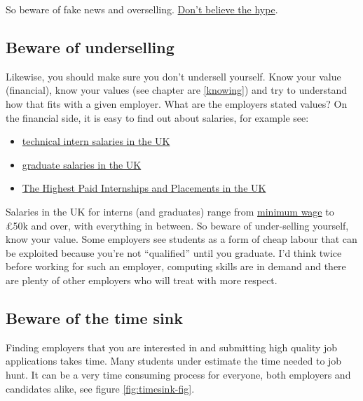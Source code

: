 \documentclass[
]{book}
\providecommand{\tightlist}{%
  \setlength{\itemsep}{0pt}\setlength{\parskip}{0pt}}
\begin{document}
So beware of fake news and overselling. \href{https://en.wikipedia.org/wiki/Don\%27t_Believe_the_Hype}{Don't believe the hype}. \citep{dontbelievethehype}

\hypertarget{undersell}{%
\subsection{Beware of underselling}\label{undersell}}

Likewise, you should make sure you don't undersell yourself. Know your value (financial), know your values (see chapter are \ref{knowing}) and try to understand how that fits with a given employer. What are the employers stated values? On the financial side, it is easy to find out about salaries, for example see:

\begin{itemize}
\tightlist
\item
  \href{https://github.com/IgWod/interns-salaries-uk-2018}{technical intern salaries in the UK} \citep{igwod}
\item
  \href{https://luminate.prospects.ac.uk/graduate-salaries-in-the-uk}{graduate salaries in the UK} \citep{michaelgrove}
\item
  \href{https://www.ratemyplacement.co.uk/blog/highest-paid-internships-placements-uk/}{The Highest Paid Internships and Placements in the UK} \citep{louiseintern}
\end{itemize}

Salaries in the UK for interns (and graduates) range from \href{https://www.gov.uk/national-minimum-wage}{minimum wage} to £50k and over, with everything in between. So beware of under-selling yourself, know your value. Some employers see students as a form of cheap labour that can be exploited because you're not ``qualified'' until you graduate. I'd think twice before working for such an employer, computing skills are in demand and there are plenty of other employers who will treat with more respect.

\hypertarget{timesink}{%
\subsection{Beware of the time sink}\label{timesink}}

Finding employers that you are interested in and submitting high quality job applications takes time. Many students under estimate the time needed to job hunt. It can be a very time consuming process for everyone, both employers and candidates alike, see figure \ref{fig:timesink-fig}.
\end{document}
